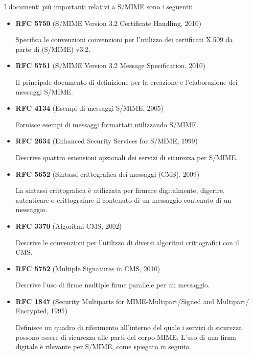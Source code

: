 I documenti più importanti relativi a S/MIME sono i seguenti:
\begin{itemize}
    \item \textbf{RFC 5750} (S/MIME Version 3.2 Certificate Handling, 2010)
    
    Specifica le convenzioni convenzioni per l'utilizzo dei certificati X.509 da parte di (S/MIME) v3.2.
    
    \item \textbf{RFC 5751} (S/MIME Version 3.2 Message Specification, 2010)
    
    Il principale documento di definizione per la creazione e l'elaborazione dei messaggi S/MIME.
    
    \item \textbf{RFC 4134} (Esempi di messaggi S/MIME, 2005)
    
    Fornisce esempi di messaggi formattati utilizzando S/MIME.
    
    \item \textbf{RFC 2634} (Enhanced Security Services for S/MIME, 1999)
    
    Descrive quattro estensioni opzionali dei servizi di sicurezza per S/MIME.
    
    \item \textbf{RFC 5652} (Sintassi crittografica dei messaggi (CMS), 2009)
    
    La sintassi crittografica è utilizzata per firmare digitalmente, digerire, autenticare o crittografare il contenuto di un messaggio contenuto di un messaggio.
    
    \item \textbf{RFC 3370} (Algoritmi CMS, 2002)
    
    Descrive le convenzioni per l'utilizzo di diversi algoritmi crittografici con il CMS.
    
    \item \textbf{RFC 5752} (Multiple Signatures in CMS, 2010)
    
    Descrive l'uso di firme multiple firme parallele per un messaggio.
    
    \item \textbf{RFC 1847} (Security Multiparts for MIME-Multipart/Signed and Multipart/ Encrypted, 1995)
    
    Definisce un quadro di riferimento all'interno del quale i servizi di sicurezza possono essere di sicurezza alle parti del corpo MIME. L'uso di una firma digitale è rilevante per S/MIME, come spiegato in seguito.
\end{itemize}

